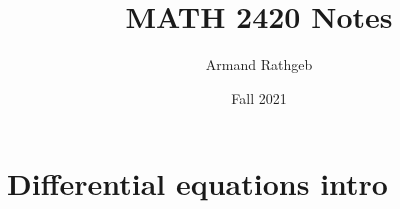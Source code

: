 \documentclass{article}
\title{MATH 2420 Notes}
\date{Fall 2021}
\author{Armand Rathgeb}
\begin{document}
  \maketitle
  \newpage
  \section{Differential equations intro}
    

  \section{}
\end{document}
